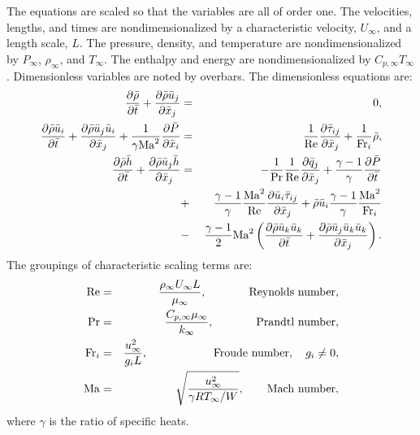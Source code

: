 The equations are scaled so that the variables are all of order one.  
The velocities, lengths, and times are nondimensionalized by 
a characteristic velocity, $U_\infty$, and a length scale, $L$.  
The pressure, density, and temperature are nondimensionalized by $P_\infty$,
$\rho_\infty$, and $T_\infty$.  The enthalpy and energy are nondimensionalized
by $C_{p,\infty} T_\infty$.  Dimensionless variables are noted
by overbars.  The dimensionless equations are:
%
\begin{eqnarray}
{{\partial \bar{\rho}} \over {\partial \bar{t}}} 
    + {{\partial \bar{\rho} \bar{u}_j} 
       \over {\partial \bar{x}_j}} & =  & 0 , \\
{{\partial \bar{\rho} \bar{u}_i} \over {\partial \bar{t}}} 
  + {{\partial \bar{\rho} \bar{u}_j \bar{u}_i}
    \over {\partial \bar{x}_j}} + {1 \over {\gamma {\rm Ma}^2}}
      {{\partial \bar{P}} \over {\partial \bar{x}_i}} & = &
    {1 \over {\rm Re}}{{\partial \bar{\tau}_{ij}} 
            \over {\partial \bar{x}_j}} 
     +  {1 \over {\rm Fr}_i} \bar{\rho} , \\
{{\partial \bar{\rho} \bar{h}} \over {\partial \bar{t}}} 
   + {{\partial \bar{\rho} \bar{u}_j \bar{h}}
    \over {\partial \bar{x}_j}}  
  & = &
    - {1 \over {\rm Pr}} {1 \over {\rm Re}} 
                    {{\partial \bar{q}_j} \over {\partial \bar{x}_j}}
 + {{\gamma - 1} \over \gamma} {{\partial \bar{P}} \over  {\partial \bar{t}}} \\
   & + & {{\gamma - 1} \over \gamma} {{{\rm Ma}^2} \over {\rm Re}}
  {{\partial \bar{u}_i \bar{\tau}_{ij}} \over {\partial \bar{x}_j}}  
 +  \bar{\rho} \bar{u}_i {{\gamma - 1} \over \gamma} 
            {{{\rm Ma}^2} \over {\rm Fr}_i} \nonumber \\
  & - & {{\gamma - 1} \over 2} {\rm Ma}^2
 \left( {{\partial \bar{\rho} \bar{u}_k \bar{u}_k} \over {\partial \bar{t}}} 
    +   {{\partial \bar{\rho} \bar{u}_j \bar{u}_k \bar{u}_k} 
        \over {\partial \bar{x}_j}} \right) . \nonumber
\end{eqnarray}
%
The groupings of characteristic scaling terms are:
%
\begin{eqnarray}
{\rm Re} & = & {{\rho_\infty U_\infty L} \over {\mu_\infty}},
    \quad \quad \phantom{xxx} \mbox{\rm Reynolds number}, \\
{\rm Pr} & = &  {{C_{p,\infty} \mu_\infty} \over {k_\infty}},
    \quad \quad \phantom{xxx} \mbox{\rm Prandtl number}, \\
{\rm Fr}_i & = & {{u_\infty^2} \over {g_i L}},
    \quad \quad \phantom{xxxxxxi} \mbox{\rm Froude number}, \quad g_i \ne 0, \\
{\rm Ma} & = & \sqrt{{u^2_\infty} \over {\gamma R T_\infty /W}},
    \quad \quad \mbox{\rm Mach number},
\end{eqnarray}
%
where $\gamma$ is the ratio of specific heats.

